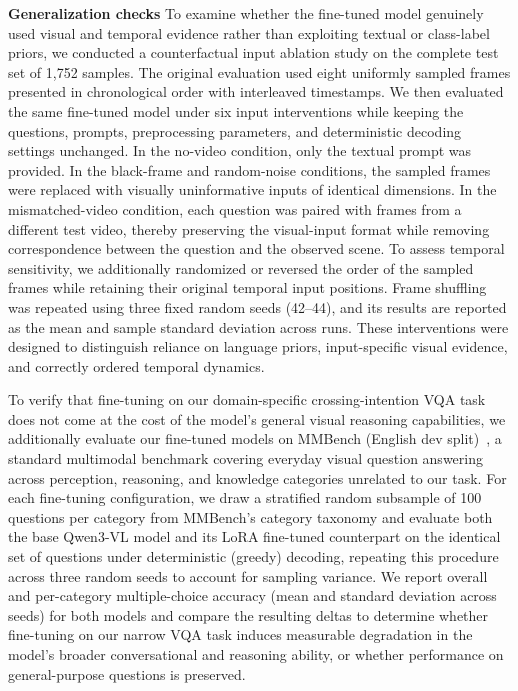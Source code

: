 \documentclass[letterpaper, 10pt, journal]{IEEEtran}  %
\begin{document}
\textbf{Generalization checks} 
To examine whether the fine-tuned model genuinely used visual and temporal evidence rather than exploiting textual or class-label priors, we conducted a counterfactual input ablation study on the complete test set of 1,752 samples. The original evaluation used eight uniformly sampled frames presented in chronological order with interleaved timestamps. We then evaluated the same fine-tuned model under six input interventions while keeping the questions, prompts, preprocessing parameters, and deterministic decoding settings unchanged. In the no-video condition, only the textual prompt was provided. In the black-frame and random-noise conditions, the sampled frames were replaced with visually uninformative inputs of identical dimensions. In the mismatched-video condition, each question was paired with frames from a different test video, thereby preserving the visual-input format while removing correspondence between the question and the observed scene. To assess temporal sensitivity, we additionally randomized or reversed the order of the sampled frames while retaining their original temporal input positions. Frame shuffling was repeated using three fixed random seeds (42--44), and its results are reported as the mean and sample standard deviation across runs. These interventions were designed to distinguish reliance on language priors, input-specific visual evidence, and correctly ordered temporal dynamics.

To verify that fine-tuning on our domain-specific crossing-intention VQA task does not come at the cost of the model's general visual reasoning capabilities, we additionally evaluate our fine-tuned models on MMBench (English dev split)~\cite{duan2024vlmevalkit}, a standard multimodal benchmark covering everyday visual question answering across perception, reasoning, and knowledge categories unrelated to our task. For each fine-tuning configuration, we draw a stratified random subsample of 100 questions per category from MMBench's category taxonomy and evaluate both the base Qwen3-VL model and its LoRA fine-tuned counterpart on the identical set of questions under deterministic (greedy) decoding, repeating this procedure across three random seeds to account for sampling variance. We report overall and per-category multiple-choice accuracy (mean and standard deviation across seeds) for both models and compare the resulting deltas to determine whether fine-tuning on our narrow VQA task induces measurable degradation in the model's broader conversational and reasoning ability, or whether performance on general-purpose questions is preserved.
\end{document}
